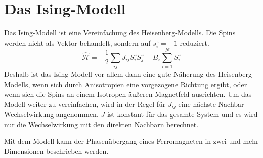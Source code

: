 \section{Das Ising-Modell}
Das Ising-Modell ist eine Vereinfachung des Heisenberg-Modells. Die Spins werden nicht als Vektor behandelt, sondern auf $s_i^z = \pm 1$ reduziert.
\begin{equation}
  \hat{\mathcal H} = -\frac 12\sum _{ij} J_{ij} S_i^z S_j^z - B_z \sum_{i=1}^N S_i^z  \label{eq:IsingHamilton}
\end{equation}
Deshalb ist das Ising-Modell vor allem dann eine gute Näherung des Heisenberg-Modells, wenn sich durch Anisotropien eine vorgezogene Richtung ergibt, oder wenn sich die Spins an einem Isotropen äußeren Magnetfeld ausrichten.
Um das Modell weiter zu vereinfachen, wird in der Regel für $J_{ij}$ eine nächste-Nachbar-Wechselwirkung angenommen. $J$ ist konstant für das gesamte System und es wird nur die Wechselwirkung mit den direkten Nachbarn berechnet.

Mit dem Modell kann der Phasenübergang eines Ferromagneten in zwei und mehr Dimensionen beschrieben werden.